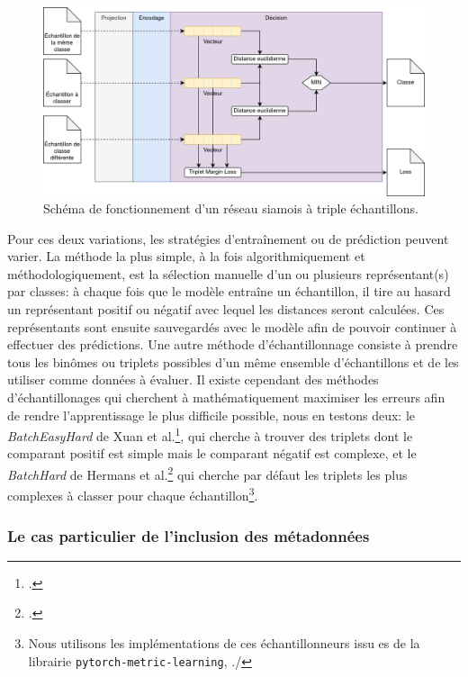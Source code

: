 \begin{figure}[ht]
    \centering
    \includegraphics[width=\linewidth]{figures/chap4/triplet.png}
    \caption{Schéma de fonctionnement d'un réseau siamois à triple échantillons.}
    \label{fig:chap4:reseau:Triplet}
\end{figure}

Pour ces deux variations, les stratégies d'entraînement ou de prédiction peuvent varier. La méthode la plus simple, à la fois algorithmiquement et méthodologiquement, est la sélection manuelle d'un ou plusieurs représentant(s) par classes: à chaque fois que le modèle entraîne un échantillon, il tire au hasard un représentant positif ou négatif avec lequel les distances seront calculées. Ces représentants sont ensuite sauvegardés avec le modèle afin de pouvoir continuer à effectuer des prédictions. Une autre méthode d'échantillonnage consiste à prendre tous les binômes ou triplets possibles d'un même ensemble d'échantillons et de les utiliser comme données à évaluer. Il existe cependant des méthodes d'échantillonages qui cherchent à mathématiquement maximiser les erreurs afin de rendre l'apprentissage le plus difficile possible, nous en testons deux: le \textit{BatchEasyHard} de Xuan et al.\footcite{xuan_improved_2020}, qui cherche à trouver des triplets dont le comparant positif est simple mais le comparant négatif est complexe, et le \textit{BatchHard} de Hermans et al.\footcite{hermans_defense_2017} qui cherche par défaut les triplets les plus complexes à classer pour chaque échantillon\footnote{Nous utilisons les implémentations de ces échantillonneurs issu es de la librairie \texttt{pytorch-metric-learning}, \textcite{musgrave2020pytorch}./}. 

\subsubsection{Le cas particulier de l'inclusion des métadonnées}
\label{chap4:part2:metadata}

